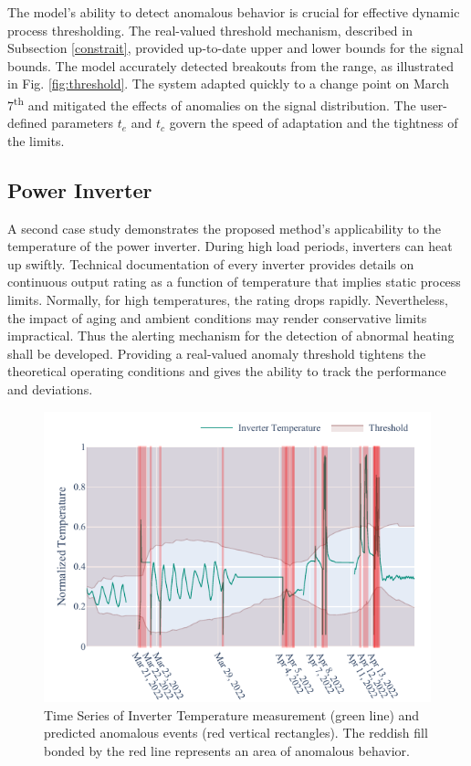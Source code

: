 The model's ability to detect anomalous behavior is crucial for effective dynamic process thresholding. The real-valued threshold mechanism, described in Subsection \ref{constrait}, provided up-to-date upper and lower bounds for the signal bounds. The model accurately detected breakouts from the range, as illustrated in Fig. \ref{fig:threshold}. The system adapted quickly to a change point on March 7\textsuperscript{th} and mitigated the effects of anomalies on the signal distribution. The user-defined parameters $t_e$ and $t_c$ govern the speed of adaptation and the tightness of the limits.

\subsection{Power Inverter}\label{AA:Case2}
A second case study demonstrates the proposed method's applicability to the temperature of the power inverter. During high load periods, inverters can heat up swiftly. Technical documentation of every inverter provides details on continuous output rating as a function of temperature that implies static process limits. Normally, for high temperatures, the rating drops rapidly. Nevertheless, the impact of aging and ambient conditions may render conservative limits impractical. Thus the alerting mechanism for the detection of abnormal heating shall be developed. Providing a real-valued anomaly threshold tightens the theoretical operating conditions and gives the ability to track the performance and deviations.

\begin{figure}[htbp]
\centerline{\includegraphics{figures/Inverter_Temperature_168_hours_sliding_thresh.pdf}}
\caption{Time Series of Inverter Temperature measurement (green line) and predicted anomalous events (red vertical rectangles). The reddish fill bonded by the red line represents an area of anomalous behavior.}
\label{fig:cs2_threshold}
\end{figure}

